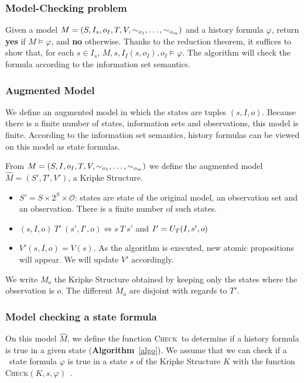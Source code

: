 \subsubsection{Model-Checking problem} Given a model $M=(S,I_s,o_I,T,V,\sim_{o_1},\dots,\sim_{o_m})$ and a history formula $\varphi$, return \textbf{yes} if $M\models\varphi$, and \textbf{no} otherwise.
Thanks to the reduction theorem, it suffices to show that, for each $s\in I_s$, $M,s,I_I(s,o_I),o_I\models\varphi$. The algorithm will check the formula according to the information set semantics.

\subsubsection{Augmented Model}
We define an augmented model in which the states are tuples $(s,I,o)$.
Because there is a finite number of states, information sets and observations, this model is finite.
According to the information set semantics, history formulas can be viewed on this model as state formulas.

From $M=(S,I,o_I,T,V,\sim_{o_1},\dots,\sim_{o_m})$ we define the augmented model $\hat{M}=(S',T',V')$, a Kripke Structure.
\begin{itemize}
\item $S'=S\times 2^{S}\times \mathcal{O}$: states are state of the original model, an observation set and an observation. There is a finite number of such states.
\item $(s,I,o)~T'~(s',I',o)\iff s~T~s'$ and $I'=U_T(I,s',o)$
\item $V'(s,I,o)=V(s)$. As the algorithm is executed, new atomic propositions will appear. We will update $V'$ accordingly.
\end{itemize}
We write $M_o$ the Kripke Structure obtained by keeping only the states where the observation is $o$. The different $M_o$ are disjoint with regards to $T'$.

\subsubsection{Model checking a state formula}
On this model $\hat{M}$, we define the function \textsc{Check}\ctlskd\ to determine if a history formula is true in a given state (\textbf{Algorithm}~\ref{algo}).
We assume that we can check if a \ctls\ state formula $\varphi$ is true in a state $s$ of the Kripke Structure $K$ with the function \textsc{Check}\ctls$(K,s,\varphi)$~\cite{DBLP:conf/popl/ClarkeES83}.

